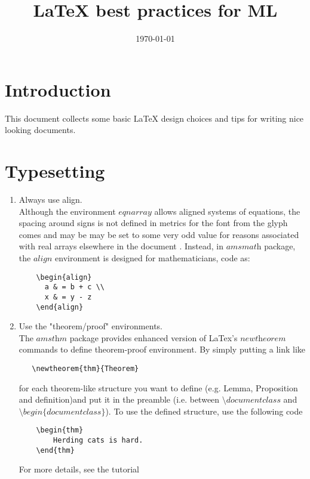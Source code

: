 \documentclass{article}
\title{LaTeX best practices for ML}
\author{}
\date{\today}
\begin{document}
\maketitle

\section{Introduction}
This document collects some basic LaTeX design choices and tips for writing nice looking documents. 

\section{Typesetting}

\begin{enumerate}
    \item Always use align. \\
    Although the environment $\textit{eqnarray}$ allows aligned systems of equations, the spacing around signs is not defined in metrics for the font from the glyph comes and may be may be set to some very odd value for reasons associated with real arrays elsewhere in the document \cite{Madsen:PJ:2006-4}. Instead, in $\textit{amsmath}$ package, the $\textit{align}$ environment is designed for mathematicians, code as:
    
    \begin{lstlisting}
    \begin{align}
      a & = b + c \\
      x & = y - z
    \end{align}
    \end{lstlisting}
   
   \item Use the "theorem/proof" environments.\\
   The $\textit{amsthm}$ package provides enhanced version of LaTex's $\textit{newtheorem}$ commands to define theorem-proof environment. By simply putting a link like
   \begin{lstlisting}
   \newtheorem{thm}{Theorem}
   \end{lstlisting}
   for each theorem-like structure you want to define (e.g. Lemma, Proposition and definition)and put it in the preamble (i.e. between $\textit{\textbackslash documentclass}$ and $\textit{\textbackslash begin\{documentclass\}}$). To use the defined structure, use the following code
   \begin{lstlisting}
    \begin{thm}
        Herding cats is hard.
    \end{thm}
   \end{lstlisting}
   For more details, see the tutorial \cite{MITtheorem}
   

\end{enumerate}
\end{document}
